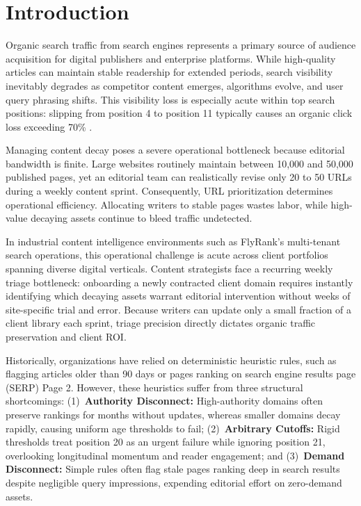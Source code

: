 \documentclass[conference]{IEEEtran}
\begin{document}
\section{Introduction}
Organic search traffic from search engines represents a primary source of audience acquisition for digital publishers and enterprise platforms. While high-quality articles can maintain stable readership for extended periods, search visibility inevitably degrades as competitor content emerges, algorithms evolve, and user query phrasing shifts. This visibility loss is especially acute within top search positions: slipping from position 4 to position 11 typically causes an organic click loss exceeding 70\% \cite{radlinski2010comparing, joachims2017accurately}.

Managing content decay poses a severe operational bottleneck because editorial bandwidth is finite. Large websites routinely maintain between 10,000 and 50,000 published pages, yet an editorial team can realistically revise only 20 to 50 URLs during a weekly content sprint. Consequently, URL prioritization determines operational efficiency. Allocating writers to stable pages wastes labor, while high-value decaying assets continue to bleed traffic undetected.

In industrial content intelligence environments such as FlyRank's multi-tenant search operations, this operational challenge is acute across client portfolios spanning diverse digital verticals. Content strategists face a recurring weekly triage bottleneck: onboarding a newly contracted client domain requires instantly identifying which decaying assets warrant editorial intervention without weeks of site-specific trial and error. Because writers can update only a small fraction of a client library each sprint, triage precision directly dictates organic traffic preservation and client ROI.

Historically, organizations have relied on deterministic heuristic rules, such as flagging articles older than 90 days or pages ranking on search engine results page (SERP) Page 2. However, these heuristics suffer from three structural shortcomings:
(1)~\textbf{Authority Disconnect:} High-authority domains often preserve rankings for months without updates, whereas smaller domains decay rapidly, causing uniform age thresholds to fail;
(2)~\textbf{Arbitrary Cutoffs:} Rigid thresholds treat position 20 as an urgent failure while ignoring position 21, overlooking longitudinal momentum and reader engagement; and
(3)~\textbf{Demand Disconnect:} Simple rules often flag stale pages ranking deep in search results despite negligible query impressions, expending editorial effort on zero-demand assets.
\end{document}
